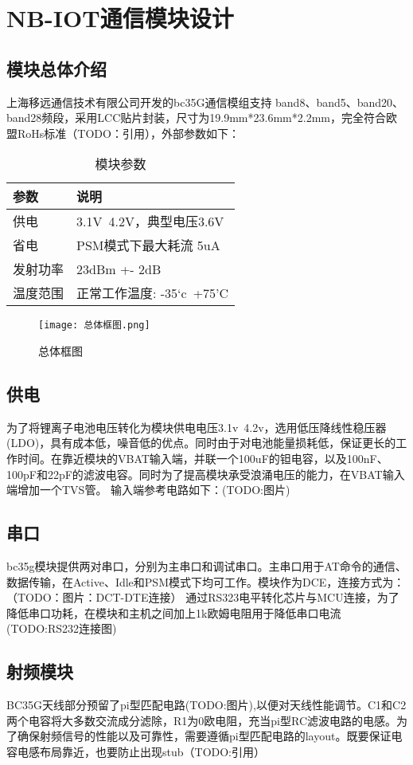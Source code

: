 
\chapter{NB-IOT通信模块设计}
\section{模块总体介绍}

上海移远通信技术有限公司开发的bc35G通信模组支持 band8、band5、band20、band28频段，采用LCC贴片封装，尺寸为19.9mm*23.6mm*2.2mm，完全符合欧盟RoHs标准（TODO：引用），外部参数如下：

\begin{table}[h!]
\caption{模块参数}
\begin{tabular}{ll}
\toprule
参数&说明\\
\midrule
供电&3.1V~4.2V，典型电压3.6V\\
省电&PSM模式下最大耗流 5uA\\
发射功率&23dBm +- 2dB\\
温度范围&正常工作温度: -35‘c~+75'C\\
\bottomrule
\end{tabular}
\label{模块参数}
\end{table}

\begin{figure}[h]
    \floatcontinue
	\texttt{[image: 总体框图.png]}
	\caption{总体框图}
	\label{总体框图}
\end{figure}


\section{供电}
为了将锂离子电池电压转化为模块供电电压3.1v~4.2v，选用低压降线性稳压器(LDO)，具有成本低，噪音低的优点。同时由于对电池能量损耗低，保证更长的工作时间。在靠近模块的VBAT输入端，并联一个100uF的钽电容，以及100nF、100pF和22pF的滤波电容。同时为了提高模块承受浪涌电压的能力，在VBAT输入端增加一个TVS管。
输入端参考电路如下：(TODO:图片)

\section{串口}
bc35g模块提供两对串口，分别为主串口和调试串口。主串口用于AT命令的通信、数据传输，在Active、Idle和PSM模式下均可工作。模块作为DCE，连接方式为：（TODO：图片：DCT-DTE连接）
通过RS323电平转化芯片与MCU连接，为了降低串口功耗，在模块和主机之间加上1k欧姆电阻用于降低串口电流(TODO:RS232连接图)

\section{射频模块}
BC35G天线部分预留了pi型匹配电路(TODO:图片),以便对天线性能调节。C1和C2两个电容将大多数交流成分滤除，R1为0欧电阻，充当pi型RC滤波电路的电感。为了确保射频信号的性能以及可靠性，需要遵循pi型匹配电路的layout。既要保证电容电感布局靠近，也要防止出现stub（TODO:引用）

